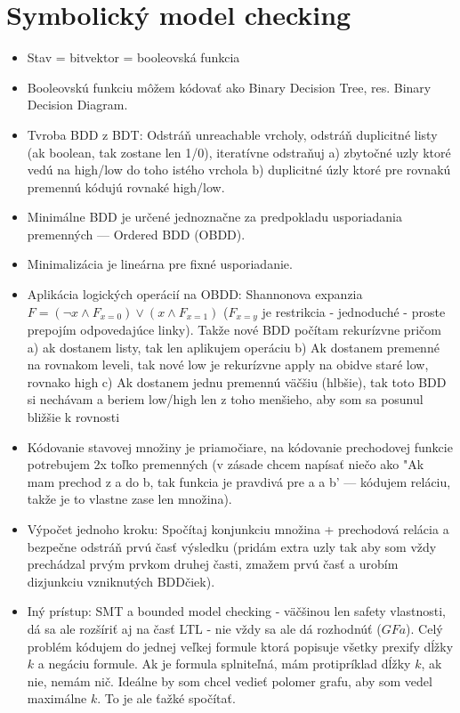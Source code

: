 \documentclass[paper=a4, fontsize=11pt]{scrartcl} %
\numberwithin{equation}{section} %
\numberwithin{figure}{section} %
\numberwithin{table}{section} %
\begin{document}
	\section{Symbolický model checking}
	
	\begin{itemize}
		\item Stav = bitvektor = booleovská funkcia
		\item Booleovskú funkciu môžem kódovať ako Binary Decision Tree, res. Binary Decision Diagram.
		\item Tvroba BDD z BDT: Odstráň unreachable vrcholy, odstráň duplicitné listy (ak boolean, tak zostane len 1/0), iteratívne odstraňuj a) zbytočné uzly ktoré vedú na high/low do toho istého vrchola b) duplicitné úzly ktoré pre rovnakú premennú kódujú rovnaké high/low.
		\item Minimálne BDD je určené jednoznačne za predpokladu usporiadania premenných — Ordered BDD (OBDD).
		\item Minimalizácia je lineárna pre fixné usporiadanie. 
		\item Aplikácia logických operácií na OBDD: Shannonova expanzia $F = (\neg x \land F_{x=0}) \lor (x \land F_{x=1})$ ($F_{x=y}$ je restrikcia - jednoduché - proste prepojím odpovedajúce linky). Takže nové BDD počítam rekurízvne pričom a) ak dostanem listy, tak len aplikujem operáciu b) Ak dostanem premenné na rovnakom leveli, tak nové low je rekurízvne apply na obidve staré low, rovnako high c) Ak dostanem jednu premennú väčšiu (hlbšie), tak toto BDD si nechávam a beriem low/high len z toho menšieho, aby som sa posunul bližšie k rovnosti
		\item Kódovanie stavovej množiny je priamočiare, na kódovanie prechodovej funkcie potrebujem 2x toľko premenných (v zásade chcem napísať niečo ako "Ak mam prechod z a do b, tak funkcia je pravdivá pre a a b' — kódujem reláciu, takže je to vlastne zase len množina).
		\item Výpočet jednoho kroku: Spočítaj konjunkciu množina + prechodová relácia a bezpečne odstráň prvú časť výsledku (pridám extra uzly tak aby som vždy prechádzal prvým prvkom druhej časti, zmažem prvú časť a urobím dizjunkciu vzniknutých BDDčiek).
		
		\item Iný prístup: SMT a bounded model checking - väčšinou len safety vlastnosti, dá sa ale rozšíriť aj na časť LTL - nie vždy sa ale dá rozhodnúť ($GF a$). Celý problém kódujem do jednej veľkej formule ktorá popisuje všetky prexify dĺžky $k$ a negáciu formule. Ak je formula splniteľná, mám protipríklad dĺžky $k$, ak nie, nemám nič. Ideálne by som chcel vedieť polomer grafu, aby som vedel maximálne $k$. To je ale ťažké spočítať.
	\end{itemize}
	
\end{document}
